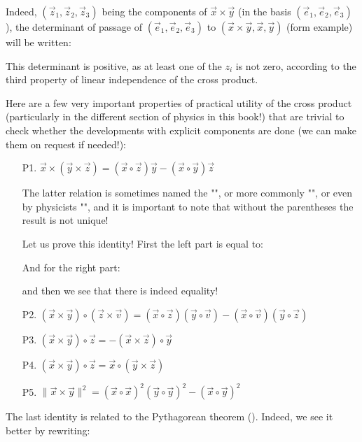 	Indeed, $(\vec{z}_1,\vec{z}_2,\vec{z}_3)$ being the components of $\vec{x}\times \vec{y}$ (in the basis $(\vec{e}_1,\vec{e}_2,\vec{e}_3)$), the determinant of passage of $(\vec{e}_1,\vec{e}_2,\vec{e}_3)$ to $(\vec{x}\times \vec{y},\vec{x},\vec{y})$ (form example) will be written:
	 
	 This determinant is positive, as at least one of the $z_i$ is not zero, according to the third property of linear independence of the cross product.
	 
	 Here are a few very important properties of practical utility of the cross product (particularly in the different section of physics in this book!) that are trivial to check whether the developments with explicit components are done (we can make them on request if needed!):
	\begin{enumerate}
		\item[P1.] $\vec{x}\times(\vec{y}\times\vec{z})=(\vec{x}\circ\vec{z})\vec{y}-(\vec{x}\circ\vec{y})\vec{z}$
		\begin{tcolorbox}[title=Remark,colframe=black,arc=10pt]
		The latter relation is sometimes named the "\label{grassman rule}", or more commonly "", or even by physicists "",  and it is important to note that without the parentheses the result is not unique!
		\end{tcolorbox}	
		Let us prove this identity! First the left part is equal to:
		
		And for the right part:
		
		and then we see that there is indeed equality!
		\item[P2.] $(\vec{x}\times\vec{y})\circ (\vec{z}\times\vec{v})=(\vec{x}\circ\vec{z})(\vec{y}\circ\vec{v})-(\vec{x}\circ\vec{v})(\vec{y}\circ\vec{z})$
		
		\item[P3.] $(\vec{x}\times\vec{y})\circ\vec{z}=-(\vec{x}\times\vec{z})\circ \vec{y}$
		
		\item[P4.] $(\vec{x}\times\vec{y})\circ\vec{z}=\vec{x}\circ(\vec{y}\times\vec{z})$
		
		\item[P5.] $\|\vec{x}\times\vec{y}\|^2=(\vec{x}\circ\vec{x})^2(\vec{y}\circ\vec{y})^2-(\vec{x}\circ\vec{y})^2$
	\end{enumerate}
	The last identity is related to the Pythagorean theorem (). Indeed, we see it better by rewriting:
	
